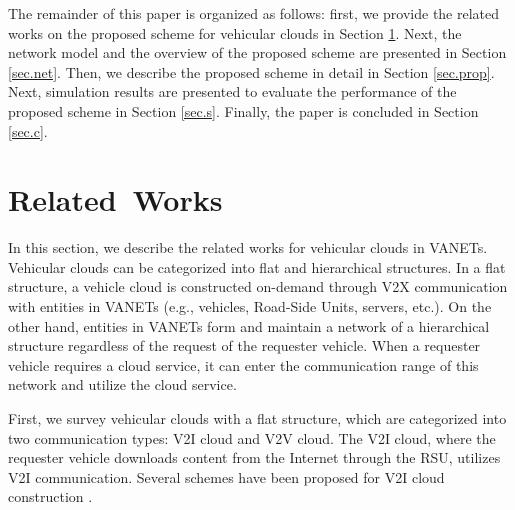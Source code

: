 \documentclass[sensors,article,accept,moreauthors,pdftex]{Definitions/mdpi}
\begin{document}
The remainder of this paper is organized as follows: 
first, we provide the related works on the proposed scheme for vehicular clouds in Section \ref{sec2}.
Next, the network model and the overview of the proposed scheme are presented in Section \ref{sec.net}. 
Then, we describe the proposed scheme in detail in Section \ref{sec.prop}.
Next, simulation results are presented to evaluate the performance of the proposed scheme in Section \ref{sec.s}.
Finally, the paper is concluded in Section \ref{sec.c}.

\section{Related~Works}\label{sec2}
In this section, we describe the related works for vehicular clouds in VANETs. Vehicular clouds can be categorized into flat and hierarchical structures. In a flat structure, a vehicle cloud is constructed on-demand through V2X communication with entities in VANETs (e.g., vehicles, Road-Side Units, servers, etc.). On the other hand, entities in VANETs form and maintain a network of a hierarchical structure regardless of the request of the requester vehicle. When a requester vehicle requires a cloud service, it can enter the communication range of this network and utilize the cloud service.

First, we survey vehicular clouds with a flat structure, which are categorized into two communication types: V2I cloud and V2V cloud. The V2I cloud, where the requester vehicle downloads content from the Internet through the RSU, utilizes V2I communication. Several schemes have been proposed for V2I cloud construction \cite{Mershad2013, Yu2013, Salahuddin2014, Lin2018, Lee2019, Jaiboon2017, Elahi2021}.
\end{document}
